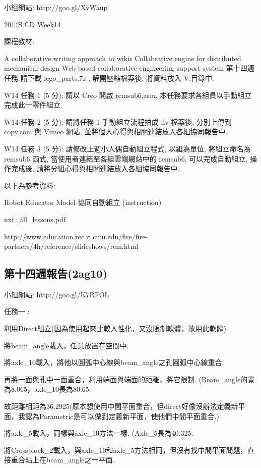 \documentclass[]{article}
\begin{document}
小組網站: http://goo.gl/XvWaup

2014S CD Week14

課程教材:

A collaborative writing approach to wikis Collabrative engine for
distributed mechanical design Web-based collaborative engineering
support system 第十四週任務 請下載 lego\_parts.7z , 解開壓縮檔案後,
將資料放入 V:\home\lego 目錄中.

W14 任務 1 (5 分): 請以 Creo 開啟 remsub6.asm,
本任務要求各組員以手動組立完成此一零件組立.

W14 任務 2 (5 分): 請將任務 1 手動組立流程拍成 flv 檔案後, 分別上傳到
copy.com 與 Vimeo 網站, 並將個人心得與相關連結放入各組協同報告中.

W14 任務 3 (5 分): 請修改上週小人偶自動組立程式, 以組為單位,
將組立命名為 remsub6 函式, 當使用者連結至各組雲端網站中的 remsub6,
可以完成自動組立, 操作完成後, 請將分組心得與相關連結放入各組協同報告中.

以下為參考資料:

Robot Educator Model 協同自動組立 (instruction)

nxt\_all\_lessons.pdf

http://www.education.rec.ri.cmu.edu/fire/fire-partners/4h/reference/slideshows/rem.html

\subsection{第十四週報告(2ag10)}\label{ux7b2cux5341ux56dbux9031ux5831ux544a2ag10}

小組網站: http://goo.gl/K7RFOL

任務一 :

利用Direct組立(因為使用起來比較人性化，又沒限制軟體，故用此軟體).

將beam\_angle載入，任意放置在空間中.

將axle\_10載入，將他以圓弧中心線與beam\_angle之孔圓弧中心線重合.

再將一面與孔中一面重合，利用端面與端面的距離，將它限制.
(Beam\_angle的寬為8.065，axle\_10長為80.65.

故距離相距為36.2925(原本想使用中間平面重合，但direct好像沒辦法定義新平面，我認為Parametric是可以做到定義新平面，使他們中間平面重合.)

將axle\_5載入，同樣與axle\_10方法一樣. (Axle\_5長為40.325.

將Crossblock\_2載入，與axle\_10和axle\_5方法相同，但沒有找中間平面問題，直接重合貼上在beam\_angle之一平面.
\end{document}
